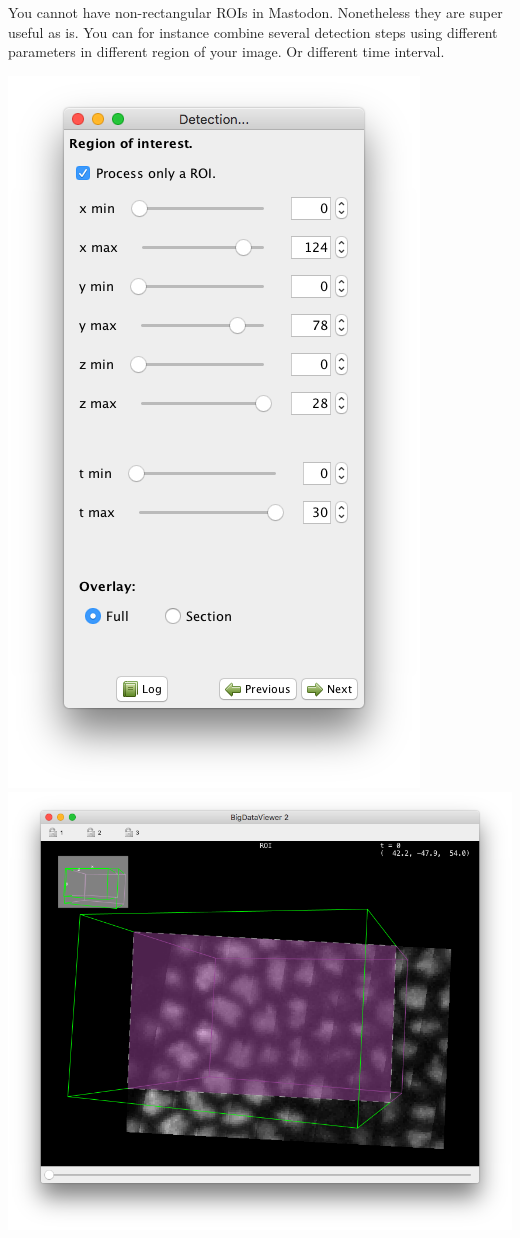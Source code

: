 You cannot have non-rectangular ROIs in Mastodon. Nonetheless they are super useful as is. 
You can for instance combine several detection steps using different parameters in different region of your image. Or different time interval.

\begin{center}
     \includegraphics[height=0.25\textheight]{figures/Mastodon_ROIpanel.png}
     \includegraphics[height=0.25\textheight]{figures/Mastodon_ROIBDV.png}
\end{center}

